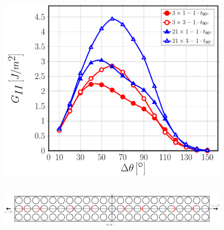 \documentclass[first,firstsupp,lastsupp,last,hyperref,table]{ETHclass}
\begin{document}
\begin{frame}
\begin{columns}[c]
\begin{column}{0.5\textwidth}
\begin{figure}
\includegraphics[width=\columnwidth]{nxk-1-vf60-GII-crackshield3.pdf}
\end{figure}
\end{column}
\end{columns}
\begin{figure}
\centering
\includegraphics[width=\textwidth]{twofibers-sameside-crackshielding3.pdf}
\end{figure}
\end{frame}

\addtocounter{framenumber}{-1}
\end{document}
